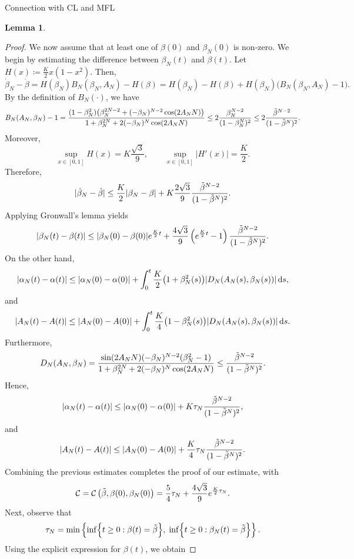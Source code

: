\documentclass{article}
\theoremstyle{definition}
\newtheorem{lemma}[definition]{Lemma}
\renewcommand{\inf}{\mathop{\mathrm{inf}\vphantom{\mathrm{sup}}}}
\renewcommand{\d}{\textnormal{d}}
\begin{document}
\begin{section}{Connection with CL and MFL}
\begin{lemma}
        \end{lemma}
            \begin{proof}
            We now assume that at least one of $\beta(0)$ and $\beta_N(0)$ is non-zero. We begin by estimating the difference between $\beta_N(t)$ and $\beta(t)$. Let $H(x)\coloneqq\frac{K}{2}x(1-x^2).$ Then,
            $$ \dot{\beta}_N-\dot{\beta} = H(\beta_N)B_N(\beta_N,A_N)-H(\beta) = H(\beta_N)-H(\beta) + H(\beta_N)\bigl(B_N(\beta_N,A_N)-1\bigr). $$
            By the definition of $B_N(\cdot)$, we have
            $$ B_N(A_N,\beta_N)-1 = \frac{(1-\beta_N^2)\bigl(\beta_N^{2N-2}+(-\beta_N)^{N-2}\cos(2A_NN)\bigr)} {1+\beta_N^{2N}+2(-\beta_N)^N\cos(2A_NN)} \leq 2\frac{\beta_N^{N-2}}{(1-\beta_N^N)^2} \leq 2\frac{\Tilde{\beta}^{N-2}}{(1-\Tilde{\beta}^N)^2}. $$
            Moreover,
            $$ \sup_{x\in[0,1]}H(x)=K\frac{\sqrt3}{9}, \qquad \sup_{x\in[0,1]}|H'(x)|=\frac{K}{2}. $$
            Therefore,
            $$ |\dot{\beta}_N-\dot{\beta}| \leq \frac{K}{2}|\beta_N-\beta| + K\frac{2\sqrt3}{9} \frac{\Tilde{\beta}^{N-2}}{(1-\Tilde{\beta}^N)^2}. $$
            Applying Gronwall's lemma yields
            $$ |\beta_N(t)-\beta(t)| \leq|\beta_N(0)-\beta(0)|e^{\frac{K}{2}t}+ \frac{4\sqrt3}{9} \left(e^{\frac{K}{2}t}-1\right) \frac{\Tilde{\beta}^{N-2}}{(1-\Tilde{\beta}^N)^2}. $$
            On the other hand,
            $$ |\alpha_N(t)-\alpha(t)| \leq |\alpha_N(0)-\alpha(0)|+\int_0^t \frac{K}{2}\bigl(1+\beta_N^2(s)\bigr) |D_N(A_N(s),\beta_N(s))| \,\d s, $$
            and
            $$ |A_N(t)-A(t)| \leq |A_N(0)-A(0)| + \int_0^t \frac{K}{4}\bigl(1-\beta_N^2(s)\bigr) |D_N(A_N(s),\beta_N(s))| \,\d s. $$
            Furthermore,
            $$ D_N(A_N,\beta_N) = \frac{\sin(2A_NN)(-\beta_N)^{N-2}(\beta_N^2-1)} {1+\beta_N^{2N}+2(-\beta_N)^N\cos(2A_NN)} \leq \frac{\Tilde{\beta}^{N-2}}{(1-\Tilde{\beta}^N)^2}. $$
            Hence,
            $$ |\alpha_N(t)-\alpha(t)| \leq|\alpha_N(0)-\alpha(0)|+ K\tau_N \frac{\Tilde{\beta}^{N-2}}{(1-\Tilde{\beta}^N)^2}, $$
            and
            $$ |A_N(t)-A(t)| \leq|A_N(0)-A(0)|+ \frac{K}{4}\tau_N \frac{\Tilde{\beta}^{N-2}}{(1-\Tilde{\beta}^N)^2}. $$
            Combining the previous estimates completes the proof of our estimate, with
            $$ \mathcal{C}=\mathcal{C}\left(\Tilde{\beta},\beta(0),\beta_N(0)\right) = \frac{5}{4} \tau_N + \frac{4\sqrt3}{9} e^{\frac{K}{2}\tau_N}. $$
            Next, observe that $$\tau_N=\min\left\{\inf\Bigl\{ t\geq0:\beta(t)=\Tilde{\beta} \Bigr\},\;\inf\Bigl\{ t\geq0:\beta_N(t)=\Tilde{\beta} \Bigr\}\right\}.$$
            Using the explicit expression for $\beta(t)$, we obtain 

\end{proof}
\end{section}
\end{document}
